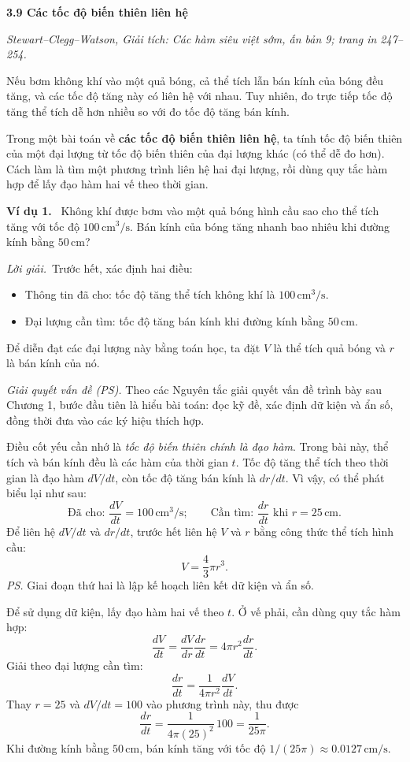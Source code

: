 \documentclass[12pt,a4paper]{article}
\newcommand{\ex}[1]{\par\medskip\noindent\textbf{Ví dụ #1.}\ }
\newcommand{\sol}{\par\nopagebreak[4]\noindent\textit{Lời giải.}\ }
\begin{document}
\begin{center}{\Large\bfseries 3.9 Các tốc độ biến thiên liên hệ}\end{center}
\noindent\textit{Stewart–Clegg–Watson, Giải tích: Các hàm siêu việt sớm, ấn bản 9; trang in 247–254.}

Nếu bơm không khí vào một quả bóng, cả thể tích lẫn bán kính của bóng đều tăng, và các tốc độ tăng này có liên hệ với nhau. Tuy nhiên, đo trực tiếp tốc độ tăng thể tích dễ hơn nhiều so với đo tốc độ tăng bán kính.

Trong một bài toán về \textbf{các tốc độ biến thiên liên hệ}, ta tính tốc độ biến thiên của một đại lượng từ tốc độ biến thiên của đại lượng khác (có thể dễ đo hơn). Cách làm là tìm một phương trình liên hệ hai đại lượng, rồi dùng quy tắc hàm hợp để lấy đạo hàm hai vế theo thời gian.

\ex{1} Không khí được bơm vào một quả bóng hình cầu sao cho thể tích tăng với tốc độ $100\,\mathrm{cm^3/s}$. Bán kính của bóng tăng nhanh bao nhiêu khi đường kính bằng $50\,\mathrm{cm}$?
\sol Trước hết, xác định hai điều:
\begin{itemize}[nosep]
\item Thông tin đã cho: tốc độ tăng thể tích không khí là $100\,\mathrm{cm^3/s}$.
\item Đại lượng cần tìm: tốc độ tăng bán kính khi đường kính bằng $50\,\mathrm{cm}$.
\end{itemize}
Để diễn đạt các đại lượng này bằng toán học, ta đặt $V$ là thể tích quả bóng và $r$ là bán kính của nó.

\noindent\textit{Giải quyết vấn đề (PS).} Theo các Nguyên tắc giải quyết vấn đề trình bày sau Chương 1, bước đầu tiên là hiểu bài toán: đọc kỹ đề, xác định dữ kiện và ẩn số, đồng thời đưa vào các ký hiệu thích hợp.

Điều cốt yếu cần nhớ là \textit{tốc độ biến thiên chính là đạo hàm}. Trong bài này, thể tích và bán kính đều là các hàm của thời gian $t$. Tốc độ tăng thể tích theo thời gian là đạo hàm $dV/dt$, còn tốc độ tăng bán kính là $dr/dt$. Vì vậy, có thể phát biểu lại như sau:
\[
\text{Đã cho: }\frac{dV}{dt}=100\,\mathrm{cm^3/s};\qquad
\text{Cần tìm: }\frac{dr}{dt}\text{ khi }r=25\,\mathrm{cm}.
\]
Để liên hệ $dV/dt$ và $dr/dt$, trước hết liên hệ $V$ và $r$ bằng công thức thể tích hình cầu:
\[V=\frac43\pi r^3.\]
\noindent\textit{PS.} Giai đoạn thứ hai là lập kế hoạch liên kết dữ kiện và ẩn số.

Để sử dụng dữ kiện, lấy đạo hàm hai vế theo $t$. Ở vế phải, cần dùng quy tắc hàm hợp:
\[\frac{dV}{dt}=\frac{dV}{dr}\frac{dr}{dt}=4\pi r^2\frac{dr}{dt}.\]
Giải theo đại lượng cần tìm:
\[\frac{dr}{dt}=\frac{1}{4\pi r^2}\frac{dV}{dt}.\]
Thay $r=25$ và $dV/dt=100$ vào phương trình này, thu được
\[\frac{dr}{dt}=\frac{1}{4\pi(25)^2}\,100=\frac{1}{25\pi}.\]
Khi đường kính bằng $50\,\mathrm{cm}$, bán kính tăng với tốc độ $1/(25\pi)\approx0.0127\,\mathrm{cm/s}$.
\end{document}
